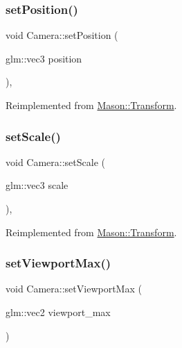 \subsubsection{\texorpdfstring{set\+Position()}{setPosition()}}
{\footnotesize\ttfamily void Camera\+::set\+Position (\begin{DoxyParamCaption}\item[{glm\+::vec3}]{position }\end{DoxyParamCaption})\hspace{0.3cm}{\ttfamily [override]}, {\ttfamily [virtual]}}



Reimplemented from \hyperlink{class_mason_1_1_transform_a740f389e20c0190c52bcb893aeaa0490}{Mason\+::\+Transform}.

\hypertarget{class_mason_1_1_camera_a732501ee31e862f557bbbc8ff58631a4}{}\label{class_mason_1_1_camera_a732501ee31e862f557bbbc8ff58631a4} 
\subsubsection{\texorpdfstring{set\+Scale()}{setScale()}}
{\footnotesize\ttfamily void Camera\+::set\+Scale (\begin{DoxyParamCaption}\item[{glm\+::vec3}]{scale }\end{DoxyParamCaption})\hspace{0.3cm}{\ttfamily [override]}, {\ttfamily [virtual]}}



Reimplemented from \hyperlink{class_mason_1_1_transform_a4a273ac58f45b6ee9cf2b37cf661daac}{Mason\+::\+Transform}.

\hypertarget{class_mason_1_1_camera_a1f9a7896bb617d1402e3c4738324e1ea}{}\label{class_mason_1_1_camera_a1f9a7896bb617d1402e3c4738324e1ea} 
\subsubsection{\texorpdfstring{set\+Viewport\+Max()}{setViewportMax()}}
{\footnotesize\ttfamily void Camera\+::set\+Viewport\+Max (\begin{DoxyParamCaption}\item[{glm\+::vec2}]{viewport\+\_\+max }\end{DoxyParamCaption})}

